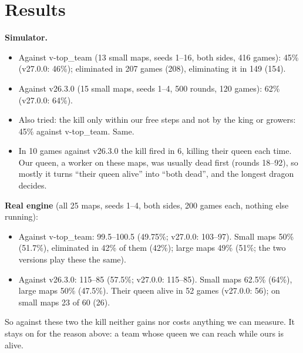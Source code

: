 \documentclass[11pt,a4paper]{article}
\begin{document}
\section{Results}\label{sec:qkillresults}
\textbf{Simulator.}
\begin{itemize}
      \item Against v-top\_team (13 small maps, seeds 1--16, both sides, 416 games): 45\% (v27.0.0: 46\%); eliminated in 207
            games (208), eliminating it in 149 (154).
      \item Against v26.3.0 (15 small maps, seeds 1--4, 500 rounds, 120 games): 62\% (v27.0.0: 64\%).
      \item Also tried: the kill only within our free steps and not by the king or growers: 45\% against v-top\_team. Same.
      \item In 10 games against v26.3.0 the kill fired in 6, killing their queen each time. Our queen, a worker on these maps,
            was usually dead first (rounds 18--92), so mostly it turns ``their queen alive'' into ``both dead'', and the
            longest dragon decides.
\end{itemize}
\textbf{Real engine} (all 25 maps, seeds 1--4, both sides, 200 games each, nothing else running):
\begin{itemize}
      \item Against v-top\_team: 99.5--100.5 (49.75\%; v27.0.0: 103--97). Small maps 50\% (51.7\%), eliminated in 42\% of them
            (42\%); large maps 49\% (51\%; the two versions play these the same).
      \item Against v26.3.0: 115--85 (57.5\%; v27.0.0: 115--85). Small maps 62.5\% (64\%), large maps 50\% (47.5\%). Their queen
            alive in 52 games (v27.0.0: 56); on small maps 23 of 60 (26).
\end{itemize}
So against these two the kill neither gains nor costs anything we can measure. It stays on for the reason above: a team
whose queen we can reach while ours is alive.
\end{document}
